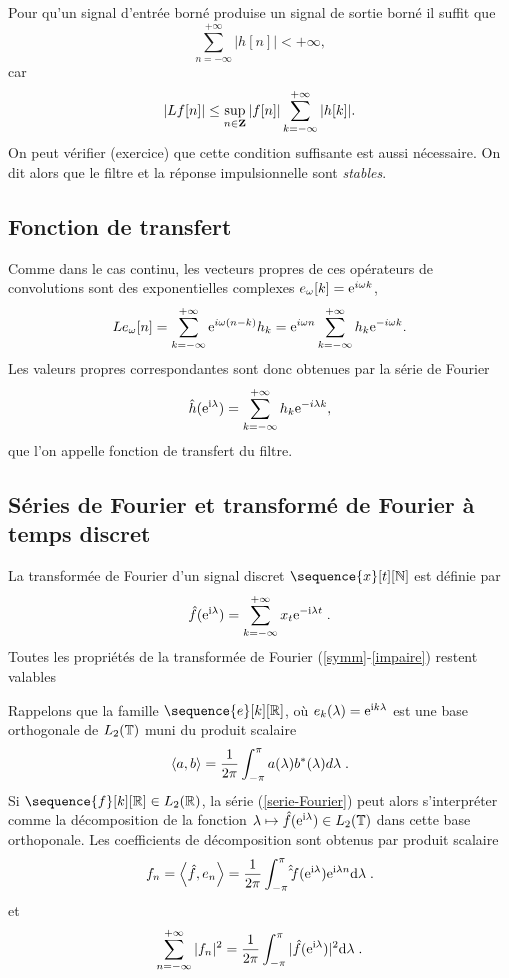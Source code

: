 Pour qu'un signal
d'entr\'ee born\'e produise un signal de sortie born\'e il suffit que
\begin{equation}
\sum_{n=- \infty}^{+ \infty} |h [ n  ]| < + \infty ,
\end{equation}
car
\[
|Lf[n]| \leq \sup_{n \in {\bf{Z}}} |f[n]|
\sum_{k=- \infty}^{+ \infty} |h [ k  ]| .
\]
On peut v\'erifier (exercice) que cette condition suffisante
est aussi n\'ecessaire.
On dit alors que le filtre et la r\'eponse impulsionnelle
sont {\it stables}.


\subsection{Fonction de transfert}
Comme dans le cas continu, les vecteurs propres de ces
op\'erateurs de convolutions sont des exponentielles complexes
$e_{\omega}[k] = \mathrm{e}^{i{\omega} k}$,
\begin{equation}
L e_{\omega} [n] = \sum_{k=- \infty}^{+ \infty}
\mathrm{e}^{i{\omega} (n-k)} h _{k} =
\mathrm{e}^{i {\omega} n} \sum_{k=- \infty}^{+ \infty} h_k \mathrm{e}^{-i {\omega} k} .
\end{equation}
Les valeurs propres correspondantes sont donc obtenues
par la s\'erie de Fourier
\begin{equation}
\hat h ( \mathrm{e}^{\mathrm{i} \lambda} ) = \sum_{k=- \infty}^{+ \infty} h_k \mathrm{e}^{-i\lambda k} ,
\end{equation}
que l'on appelle fonction de transfert du filtre.

\subsection{S\'eries de Fourier et transform\'e de Fourier \`a temps discret}
La transform\'ee de Fourier d'un signal discret $\sequence{x}[t][\nset]$
est d\'efinie par
\begin{equation}
\label{serie-Fourier}
\hat f (\mathrm{e}^{\mathrm{i} \lambda} ) = \sum_{k=- \infty}^{+ \infty}  x_t \mathrm{e}^{-\mathrm{i} \lambda t} \;.
\end{equation}
Toutes les propri\'et\'es de la transform\'ee de Fourier
(\ref{symm}-\ref{impaire}) restent  valables

Rappelons que la famille $\sequence{e}[k][\zset]$, où $e_k(\lambda)= \mathrm{e}^{\mathrm{i} k \lambda}$ est une
base orthogonale de $L_2(\mathbb{T})$ muni du produit scalaire
\[
\left\langle a, b \right\rangle =
\frac 1 {2 \pi} \int_{- \pi}^{\pi} a(\lambda) b^*(\lambda) d \lambda \;.
\]
Si $\sequence{f}[k][\zset] \in \ltwo(\zset)$,
la s\'erie (\ref{serie-Fourier}) peut
alors s'interpr\'eter
comme la d\'ecomposition de la fonction $\lambda \mapsto \hat{f}({\mathrm{e}^{\mathrm{i} \lambda}}) \in L_2(\mathbb{T})$
dans cette base orthoponale. Les coefficients de d\'ecomposition
sont obtenus par produit scalaire
\begin{equation}
\label{recons_discret}
f_n = \left\langle \hat{f}, e_n \right\rangle = \frac 1 {2 \pi}
\int_{- \pi}^{\pi} \hat \hat{f}(\mathrm{e}^{\mathrm{i} \lambda}) \mathrm{e}^{\mathrm{i} \lambda n} \mathrm{d} \lambda \;.
\end{equation}
et
\begin{equation}
\sum_{n=-\infty}^{+\infty} |f_n|^2 =
\frac 1 {2 \pi} \int_{- \pi}^{\pi} |\hat f(\mathrm{e}^{\mathrm{i} \lambda })|^2 \mathrm{d} \lambda \;.
\end{equation}

